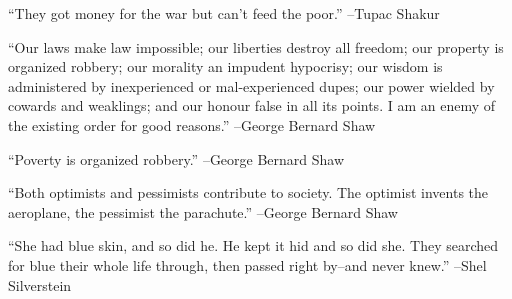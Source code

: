 \documentclass{article}%
\begin{document}
\linebreak%
\vspace{1mm}%
\begin{minipage}{\textwidth}%
\flushleft%
“They got money for the war but can't feed the poor.”%
\linebreak%
\vspace{1mm}%
–Tupac Shakur%
\linebreak%
\vspace{1mm}%
\end{minipage}%
\linebreak%
\vspace{1mm}%
\begin{minipage}{\textwidth}%
\flushleft%
“Our laws make law impossible; our liberties destroy all freedom; our property is organized robbery; our morality an impudent hypocrisy; our wisdom is administered by inexperienced or mal{-}experienced dupes; our power wielded by cowards and weaklings; and our honour false in all its points. I am an enemy of the existing order for good reasons.”%
\linebreak%
\vspace{1mm}%
–George Bernard Shaw%
\linebreak%
\vspace{1mm}%
\end{minipage}%
\linebreak%
\vspace{1mm}%
\begin{minipage}{\textwidth}%
\flushleft%
“Poverty is organized robbery.”%
\linebreak%
\vspace{1mm}%
–George Bernard Shaw%
\linebreak%
\vspace{1mm}%
\end{minipage}%
\linebreak%
\vspace{1mm}%
\begin{minipage}{\textwidth}%
\flushleft%
“Both optimists and pessimists contribute to society. The optimist invents the aeroplane, the pessimist the parachute.”%
\linebreak%
\vspace{1mm}%
–George Bernard Shaw%
\linebreak%
\vspace{1mm}%
\end{minipage}%
\linebreak%
\vspace{1mm}%
\begin{minipage}{\textwidth}%
\flushleft%
“She had blue skin, and so did he. He kept it hid and so did she. They searched for blue their whole life through, then passed right by–and never knew.”%
\linebreak%
\vspace{1mm}%
–Shel Silverstein%
\linebreak%
\vspace{1mm}%
\end{minipage}%
\end{document}
